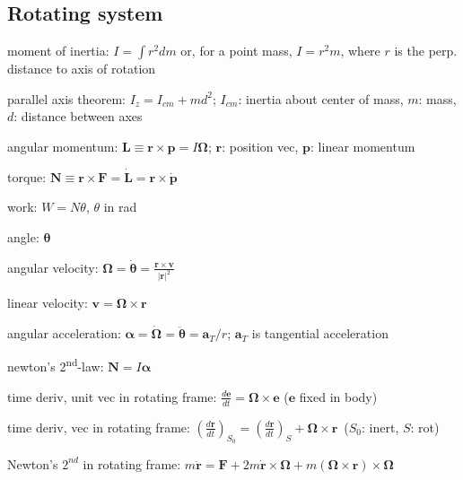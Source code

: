 \documentclass[letterpaper,landscape,10pt]{article}
\newenvironment{mydescription}
{\begin{description}
	\setlength{\itemsep}{0pt}
	\setlength{\parskip}{0pt}
	\setlength{\parsep}{-1pt}}
{\end{description}}
\begin{document}
{\begin{multicols}{3}
	\subsection*{Rotating system}
		\begin{mydescription}
			\item[moment of inertia:]
				$I = \int r^2dm$ or, for a point mass, $I = r^2m$, where $r$ is
				the perp. distance to axis of rotation  \\
			\item[parallel axis theorem:]
				$I_z=I_{cm}+md^2$; $I_{cm}$: inertia about center of mass, $m$:
				mass, $d$: distance between axes  \\
			\item[angular momentum:]
				$\mathbf{L}\equiv \mathbf{r} \times \mathbf{p} = I\mathbf{\Omega}$;
					$\mathbf{r}$: position vec, $\mathbf{p}$: linear momentum   \\
			\item[torque:]
				$\mathbf{N}\equiv \mathbf{r}\times \mathbf{F} = \dot{\mathbf{L}} =
				\mathbf{r}\times\dot{\mathbf{p}}$  \\
			\item[work:]
				$W = N \theta$, $\theta$ in rad \\
			\item[angle:]
				$\mathbf{\theta}$  \\
			\item[angular velocity:]
				$\mathbf{\Omega} =
				\dot{\mathbf{\theta}} =
					\frac{\mathbf{r}\times \mathbf{v}}{|\mathbf{r}|^2}$\\
			\item[linear velocity:]
				$\mathbf{v}=\mathbf{\Omega}\times \mathbf{r}$ \\
			\item[angular acceleration:]
				$\mathbf{\alpha} =
					\dot{\mathbf{\Omega}} = \ddot{\mathbf{\theta}} = \mathbf{a}_T/r$;
					$\mathbf{a}_T$ is tangential acceleration  \\
			\item[newton's 2\textsuperscript{nd}-law:]
					$\mathbf{N} = I\mathbf{\alpha}$
			\item[time deriv, unit vec in rotating frame:]
			  $\frac{d\mathbf{e}}{dt}=\mathbf{\Omega}\times\mathbf{e}$ ($\mathbf{e}$ fixed in
			  body)
			\item[time deriv, vec in rotating frame:]$\left( \frac{d\mathbf{r}}{dt}
			  \right)_{S_0} = \left( \frac{d\mathbf{r}}{dt} \right)_{S} +
			  \mathbf{\Omega} \times \mathbf{r}\,$ ($S_0$: inert, $S$: rot)
			\item[Newton's $2^{nd}$ in rotating frame:] $m\ddot{\mathbf{r}} =
			  \mathbf{F}+2m\dot{\mathbf{r}}\times\mathbf{\Omega}+m\left(
			  \mathbf{\Omega\times\mathbf{r}} \right)\times\mathbf{\Omega}$
		\end{mydescription}
	

\end{multicols}}
\end{document}
